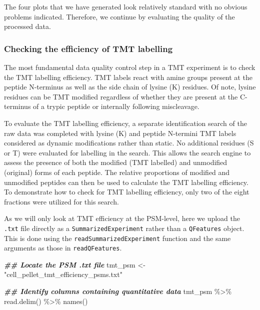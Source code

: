 \documentclass[9pt,a4paper,]{extarticle}
\newenvironment{Shaded}{\begin{snugshade}}{\end{snugshade}}
\newcommand{\DocumentationTok}[1]{\textcolor[rgb]{0.56,0.35,0.01}{\textbf{\textit{#1}}}}
\newcommand{\FunctionTok}[1]{\textcolor[rgb]{0.00,0.00,0.00}{#1}}
\newcommand{\NormalTok}[1]{#1}
\newcommand{\OtherTok}[1]{\textcolor[rgb]{0.56,0.35,0.01}{#1}}
\newcommand{\SpecialCharTok}[1]{\textcolor[rgb]{0.00,0.00,0.00}{#1}}
\newcommand{\StringTok}[1]{\textcolor[rgb]{0.31,0.60,0.02}{#1}}
\begin{document}
The four plots that we have generated look relatively standard with no obvious
problems indicated. Therefore, we continue by evaluating the quality of the
processed data.

\hypertarget{checking-the-efficiency-of-tmt-labelling}{%
\subsubsection{Checking the efficiency of TMT labelling}\label{checking-the-efficiency-of-tmt-labelling}}

The most fundamental data quality control step in a TMT experiment is to check
the TMT labelling efficiency. TMT labels react with amine groups present at the
peptide N-terminus as well as the side chain of lysine (K) residues. Of note,
lysine residues can be TMT modified regardless of whether they are present at the
C-terminus of a trypic peptide or internally following miscleavage.

To evaluate the TMT labelling efficiency, a separate identification search of the
raw data was completed with lysine (K) and peptide N-termini TMT labels
considered as dynamic modifications rather than static. No additional residues
(S or T) were evaluated for labelling in the search. This allows the search
engine to assess the presence of both the modified (TMT labelled) and unmodified
(original) forms of each peptide. The relative proportions of modified and
unmodified peptides can then be used to calculate the TMT labelling efficiency.
To demonstrate how to check for TMT labelling efficiency, only two of the eight
fractions were utilized for this search.

As we will only look at TMT efficiency at the PSM-level, here we upload the \texttt{.txt}
file directly as a \texttt{SummarizedExperiment} rather than a \texttt{QFeatures} object.
This is done using the \texttt{readSummarizedExperiment} function and the same arguments
as those in \texttt{readQFeatures}.

\begin{Shaded}
\begin{Highlighting}[]
\DocumentationTok{\#\# Locate the PSM .txt file}
\NormalTok{tmt\_psm }\OtherTok{\textless{}{-}} \StringTok{"cell\_pellet\_tmt\_efficiency\_psms.txt"}

\DocumentationTok{\#\# Identify columns containing quantitative data}
\NormalTok{tmt\_psm }\SpecialCharTok{\%\textgreater{}\%}
  \FunctionTok{read.delim}\NormalTok{() }\SpecialCharTok{\%\textgreater{}\%}
  \FunctionTok{names}\NormalTok{()}
\end{Highlighting}
\end{Shaded}
\end{document}

